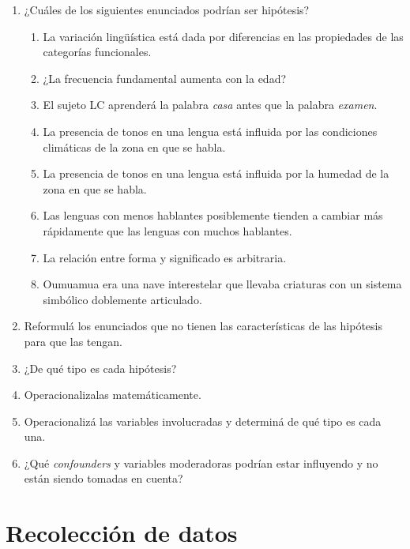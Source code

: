 \documentclass[12pt,spanish,a4paper,]{article}
\providecommand{\tightlist}{%
  \setlength{\itemsep}{0pt}\setlength{\parskip}{0pt}}
\begin{document}
\begin{enumerate}
\def\labelenumi{\arabic{enumi}.}
\tightlist
\item
  ¿Cuáles de los siguientes enunciados podrían ser hipótesis?

  \begin{enumerate}
  \def\labelenumii{\alph{enumii}.}
  \tightlist
  \item
    La variación lingüística está dada por diferencias en las
    propiedades de las categorías funcionales.
  \item
    ¿La frecuencia fundamental aumenta con la edad?
  \item
    El sujeto LC aprenderá la palabra \emph{casa} antes que la palabra
    \emph{examen}.
  \item
    La presencia de tonos en una lengua está influida por las
    condiciones climáticas de la zona en que se habla.
  \item
    La presencia de tonos en una lengua está influida por la humedad de
    la zona en que se habla.
  \item
    Las lenguas con menos hablantes posiblemente tienden a cambiar más
    rápidamente que las lenguas con muchos hablantes.
  \item
    La relación entre forma y significado es arbitraria.
  \item
    Oumuamua era una nave interestelar que llevaba criaturas con un
    sistema simbólico doblemente articulado.
  \end{enumerate}
\item
  Reformulá los enunciados que no tienen las características de las
  hipótesis para que las tengan.
\item
  ¿De qué tipo es cada hipótesis?
\item
  Operacionalizalas matemáticamente.
\item
  Operacionalizá las variables involucradas y determiná de qué tipo es
  cada una.
\item
  ¿Qué \emph{confounders} y variables moderadoras podrían estar
  influyendo y no están siendo tomadas en cuenta?
\end{enumerate}

\hypertarget{recoleccion-de-datos}{%
\section{Recolección de datos}\label{recoleccion-de-datos}}
\end{document}
